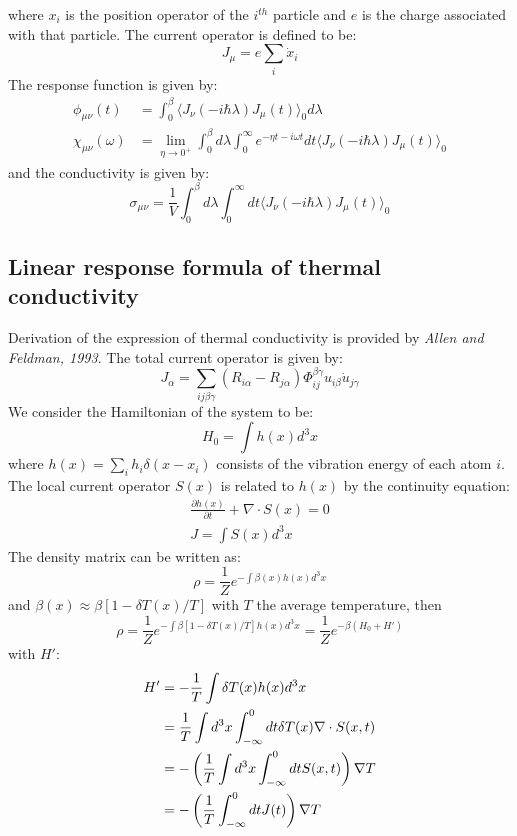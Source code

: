 \documentclass{article}
\begin{document}
where $x_i$ is the position operator of the $i^{th}$ particle and $e$ is the charge associated with that
particle. The current operator is 
defined to be:
\begin{equation}
    J_{\mu} = e \sum_i \dot{x}_i
\end{equation}
The response function is given by:
\begin{align}
    \phi_{\mu\nu} (t) &= \int_0^{\beta} \langle J_{\nu}(-i\hbar\lambda) J_{\mu}(t) \rangle_0 d\lambda \\
    \chi_{\mu\nu}(\omega)&= 
    \lim_{\eta\to 0^+} \int_0^{\beta} d\lambda \int_{0}^{\infty} e^{-\eta t-i\omega t} dt  \langle J_{\nu}(-i\hbar\lambda) J_{\mu}(t) \rangle_0
\end{align}
and the conductivity is given by:
\begin{equation}
    \sigma_{\mu\nu} = \frac{1}{V} \int_0^{\beta} d\lambda \int_{0}^{\infty} dt \langle J_{\nu}(-i\hbar\lambda) J_{\mu}(t) \rangle_0
\end{equation}

\subsection{Linear response formula of thermal conductivity}
Derivation of the expression of thermal conductivity is provided by \emph{Allen and Feldman, 1993}. 
The total current operator is given by:
\begin{equation}
    J_{\alpha} = \sum_{ij\beta\gamma} (R_{i\alpha} - R_{j\alpha}) \Phi_{ij}^{\beta\gamma} u_{i\beta} \dot{u}_{j\gamma}
\end{equation}
We consider the Hamiltonian of the system to be:
\begin{equation}
    H_0 = \int h(x)  d^3x
\end{equation}
where $h(x) = \sum_i h_i \delta(x - x_i)$ consists of the vibration energy of each atom $i$. 
The local current operator $S(x)$ is related to $h(x)$ by the continuity equation:
\begin{gather}
    \frac{\partial h(x)}{\partial t} + \nabla\cdot S(x) = 0 \\
    J = \int S(x) d^3x
\end{gather}
The density matrix can be written as:
\begin{equation}
    \rho = \frac{1}{Z} e^{- \int \beta(x) h(x) d^3x}
\end{equation}
and $\beta(x) \approx \beta[1-\delta T(x)/T]$ with $T$ the average temperature, then
\begin{equation}
    \rho = \frac{1}{Z} e^{- \int \beta[1-\delta T(x)/T] h(x) d^3x} = \frac{1}{Z} e^{- \beta (H_0 + H')}
\end{equation}
with $H'$:
\begin{align}
    H' &= -\frac{1}{T} \int \delta T(x)h(x) d^3x \notag \\
        & = \frac{1}{T} \int d^3x \int _{-\infty}^{0} dt \delta T(x) \nabla\cdot S(x,t) \notag \\
        & = - \left( \frac{1}{T} \int d^3x \int _{-\infty}^{0} dt S(x,t) \right) \nabla T \notag \\
        & = - \left( \frac{1}{T} \int _{-\infty}^{0} dt J(t) \right) \nabla T 
\end{align}
\end{document}
